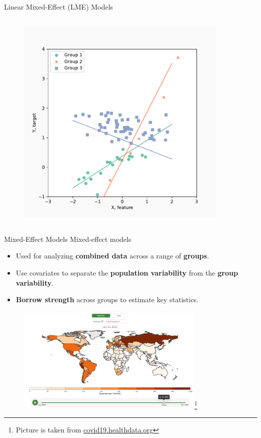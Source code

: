 \documentclass[8pt]{beamer}
\begin{document}
\begin{frame}{Linear Mixed-Effect (LME) Models}
\begin{columns}[T,onlytextwidth]
    	\centering  
   	\begin{figure}
   		\includegraphics[width=0.9\textwidth]{Figures/lme_example_random_prediction}
   	\end{figure}
   	   		

   	
  \end{columns}
\end{frame}

\begin{frame}{Mixed-Effect Models}
Mixed-effect models
\begin{itemize}
	\item Used for analyzing \textbf{combined data} across a range of \textbf{groups}.
	\item Use covariates to separate the \textbf{population variability} from the \textbf{group variability}.
	\item \textbf{Borrow strength} across groups to estimate key statistics. %
\end{itemize}

\begin{figure}
	\centering
	\includegraphics[width=0.8\textwidth]{Figures/ihme_predictions.png}\footnote{Picture is taken from \href{covid19.healthdata.org}{covid19.healthdata.org} }
\end{figure}

\end{frame}
\end{document}
